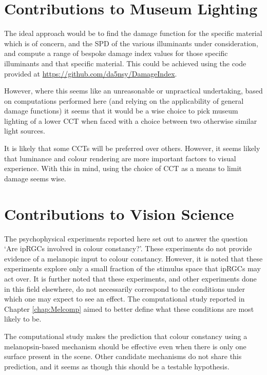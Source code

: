 \section{Contributions to Museum Lighting}

The ideal approach would be to find the damage function for the specific material which is of concern, and the \gls{SPD} of the various illuminants under consideration, and compute a range of bespoke damage index values for those specific illuminants and that specific material. This could be achieved using the code provided at \url{https://github.com/da5nsy/DamageIndex}.

However, where this seems like an unreasonable or unpractical undertaking, based on computations performed here (and relying on the applicability of general damage functions) it seems that it would be a wise choice to pick museum lighting of a lower \gls{CCT} when faced with a choice between two otherwise similar light sources.

It is likely that some \glspl{CCT} will be preferred over others. However, it seems likely that luminance and colour rendering are more important factors to visual experience. With this in mind, using the choice of \gls{CCT} as a means to limit damage seems wise.

\section{Contributions to Vision Science}

The psychophysical experiments reported here set out to answer the question `Are \glspl{ipRGC} involved in colour constancy?'. These experiments do not provide evidence of a melanopic input to colour constancy. However, it is noted that these experiments explore only a small fraction of the stimulus space that \glspl{ipRGC} may act over. It is further noted that these experiments, and other experiments done in this field elsewhere, do not necessarily correspond to the conditions under which one may expect to see an effect. The computational study reported in Chapter \ref{chap:Melcomp} aimed to better define what these conditions are most likely to be.

The computational study makes the prediction that colour constancy using a melanopsin-based mechanism should be effective even when there is only one surface present in the scene. Other candidate mechanisms do not share this prediction, and it seems as though this should be a testable hypothesis.

